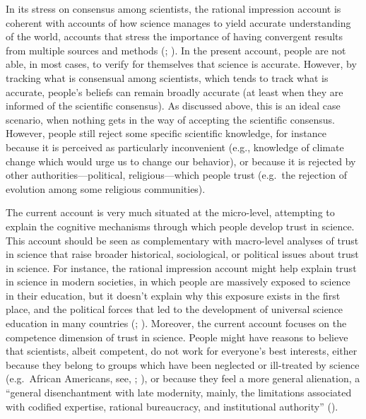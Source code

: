 \documentclass[
  man,
  floatsintext,
  longtable,
  nolmodern,
  notxfonts,
  notimes,
  colorlinks=true,linkcolor=blue,citecolor=blue,urlcolor=blue]{apa7}
\begin{document}
In its stress on consensus among scientists, the rational impression
account is coherent with accounts of how science manages to yield
accurate understanding of the world, accounts that stress the importance
of having convergent results from multiple sources and methods
(; ).
In the present account, people are not able, in most cases, to verify
for themselves that science is accurate. However, by tracking what is
consensual among scientists, which tends to track what is accurate,
people's beliefs can remain broadly accurate (at least when they are
informed of the scientific consensus). As discussed above, this is an
ideal case scenario, when nothing gets in the way of accepting the
scientific consensus. However, people still reject some specific
scientific knowledge, for instance because it is perceived as
particularly inconvenient (e.g., knowledge of climate change which would
urge us to change our behavior), or because it is rejected by other
authorities---political, religious---which people trust (e.g.~the
rejection of evolution among some religious communities).~

The current account is very much situated at the micro-level, attempting
to explain the cognitive mechanisms through which people develop trust
in science. This account should be seen as complementary with
macro-level analyses of trust in science that raise broader historical,
sociological, or political issues about trust in science. For instance,
the rational impression account might help explain trust in science in
modern societies, in which people are massively exposed to science in
their education, but it doesn't explain why this exposure exists in the
first place, and the political forces that led to the development of
universal science education in many countries
(;
).
Moreover, the current account focuses on the competence dimension of
trust in science. People might have reasons to believe that scientists,
albeit competent, do not work for everyone's best interests, either
because they belong to groups which have been neglected or ill-treated
by science (e.g.~African Americans, see,
;
), or because they feel a more general alienation, a ``general
disenchantment with late modernity, mainly, the limitations associated
with codified expertise, rational bureaucracy, and institutional
authority'' ().
\end{document}

